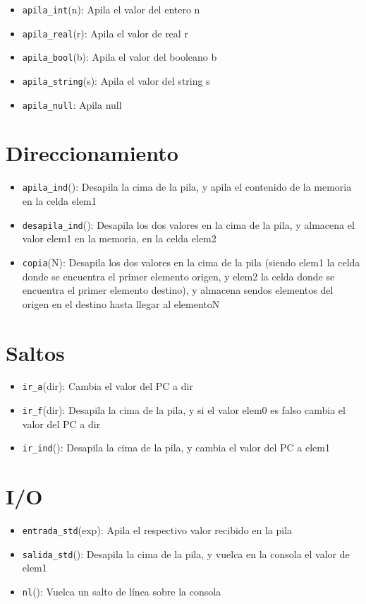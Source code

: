 \begin{itemize}
    \item \texttt{apila\_int}(n): Apila el valor del entero n
    \item \texttt{apila\_real}(r): Apila el valor de real r
    \item \texttt{apila\_bool}(b): Apila el valor del booleano b
    \item \texttt{apila\_string}(s): Apila el valor del string s
    \item \texttt{apila\_null}: Apila null
\end{itemize}

\section{Direccionamiento}

\begin{itemize}
    \item \texttt{apila\_ind}(): Desapila la cima de la pila, y apila el contenido de la memoria en la celda elem1
    \item \texttt{desapila\_ind}(): Desapila los dos valores en la cima de la pila, y almacena el valor elem1 en la memoria, en la celda elem2
    \item \texttt{copia}(N): Desapila los dos valores en la cima de la pila (siendo elem1 la celda donde se encuentra el primer elemento origen, y elem2 la celda donde se encuentra el primer elemento destino), y almacena sendos elementos del origen en el destino hasta llegar al elementoN
\end{itemize}

\section{Saltos}

\begin{itemize}
    \item \texttt{ir\_a}(dir): Cambia el valor del PC a dir
    \item \texttt{ir\_f}(dir): Desapila la cima de la pila, y si el valor elem0 es falso cambia el valor del PC a dir
    \item \texttt{ir\_ind}(): Desapila la cima de la pila, y cambia el valor del PC a elem1
\end{itemize}

\section{I/O}

\begin{itemize}
    \item \texttt{entrada\_std}(exp): Apila el respectivo valor recibido en la pila
    \item \texttt{salida\_std}(): Desapila la cima de la pila, y vuelca en la consola el valor de elem1
    \item \texttt{nl}(): Vuelca un salto de línea sobre la consola
\end{itemize}